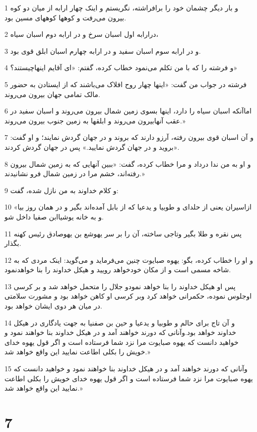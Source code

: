 \par 1 و بار دیگر چشمان خود را برافراشته، نگریستم و اینک چهار ارابه از میان دو کوه بیرون می‌رفت و کوهها کوههای مسین بود.
\par 2 درارابه اول اسبان سرخ و در ارابه دوم اسبان سیاه،
\par 3 و در ارابه سوم اسبان سفید و در ارابه چهارم اسبان ابلق قوی بود.
\par 4 و فرشته را که با من تکلم می‌نمود خطاب کرده، گفتم: «ای آقایم اینهاچیستند؟»
\par 5 فرشته در جواب من گفت: «اینها چهار روح افلاک می‌باشند که از ایستادن به حضور مالک تمامی جهان بیرون می‌روند.
\par 6 اماآنکه اسبان سیاه را دارد، اینها بسوی زمین شمال بیرون می‌روند و اسبان سفید در عقب آنهابیرون می‌روند و ابلقها به زمین جنوب بیرون می‌روند.»
\par 7 و آن اسبان قوی بیرون رفته، آرزو دارند که بروند و در جهان گردش نمایند؛ و او گفت: «بروید و در جهان گردش نمایید.» پس در جهان گردش کردند.
\par 8 و او به من ندا در‌داد و مرا خطاب کرده، گفت: «ببین آنهایی که به زمین شمال بیرون رفته‌اند، خشم مرا در زمین شمال فرو نشانیدند.»
\par 9 و کلام خداوند به من نازل شده، گفت:
\par 10 «ازاسیران یعنی از حلدای و طوبیا و یدعیا که از بابل آمده‌اند بگیر و در همان روز بیا و به خانه یوشیاابن صفیا داخل شو.
\par 11 پس نقره و طلا بگیر وتاجی ساخته، آن را بر سر یهوشع بن یهوصادق رئیس کهنه بگذار.
\par 12 و او را خطاب کرده، بگو: یهوه صبایوت چنین می‌فرماید و می‌گوید: اینک مردی که به شاخه مسمی است و از مکان خودخواهد رویید و هیکل خداوند را بنا خواهدنمود.
\par 13 پس او هیکل خداوند را بنا خواهد نمودو جلال را متحمل خواهد شد و بر کرسی اوجلوس نموده، حکمرانی خواهد کرد وبر کرسی او کاهن خواهد بود و مشورت سلامتی در میان هر دوی ایشان خواهد بود.
\par 14 و آن تاج برای حالم و طوبیا و یدعیا و حین بن صفنیا به جهت یادگاری در هیکل خداوند خواهد بود.وآنانی که دورند خواهند آمد و در هیکل خداوند بنا خواهند نمود و خواهید دانست که یهوه صبایوت مرا نزد شما فرستاده است و اگر قول یهوه خدای خویش را بکلی اطاعت نمایید این واقع خواهد شد.»
\par 15 وآنانی که دورند خواهند آمد و در هیکل خداوند بنا خواهند نمود و خواهید دانست که یهوه صبایوت مرا نزد شما فرستاده است و اگر قول یهوه خدای خویش را بکلی اطاعت نمایید این واقع خواهد شد.»

\chapter{7}

